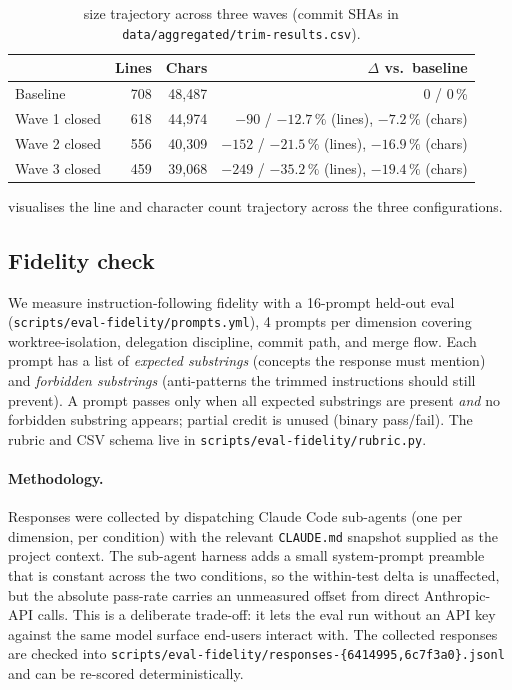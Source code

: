 \begin{table}[h]
\centering
\caption{\claudemd size trajectory across three waves (commit SHAs in
\texttt{data/aggregated/trim-results.csv}).}
\label{tab:size}
\begin{tabular}{lrrr}
\toprule
                  & Lines & Chars  & $\Delta$ vs.\ baseline \\
\midrule
Baseline          & 708   & 48{,}487 & 0 / 0\,\%             \\
Wave 1 closed     & 618   & 44{,}974 & $-90$ / $-12.7\,\%$ (lines), $-7.2\,\%$ (chars) \\
Wave 2 closed     & 556   & 40{,}309 & $-152$ / $-21.5\,\%$ (lines), $-16.9\,\%$ (chars) \\
Wave 3 closed     & 459   & 39{,}068 & $-249$ / $-35.2\,\%$ (lines), $-19.4\,\%$ (chars) \\
\bottomrule
\end{tabular}
\end{table}

 visualises the line and character count
trajectory across the three configurations.


\subsection{Fidelity check}
\label{sec:eval:fidelity}

We measure instruction-following fidelity with a 16-prompt held-out
eval (\texttt{scripts/\allowbreak eval-fidelity/\allowbreak prompts.yml}), 4 prompts per
dimension covering worktree-isolation, delegation discipline, commit
path, and merge flow. Each prompt has a list of
\emph{expected substrings} (concepts the response must mention) and
\emph{forbidden substrings} (anti-patterns the trimmed instructions
should still prevent). A prompt passes only when all expected
substrings are present \emph{and} no forbidden substring appears;
partial credit is unused (binary pass/fail). The rubric and CSV
schema live in \texttt{scripts/eval-fidelity/rubric.py}.

\paragraph{Methodology.}
Responses were collected by dispatching Claude Code sub-agents (one
per dimension, per condition) with the relevant \texttt{CLAUDE.md}
snapshot supplied as the project context. The sub-agent harness
adds a small system-prompt preamble that is constant across the two
conditions, so the within-test delta is unaffected, but the absolute
pass-rate carries an unmeasured offset from direct Anthropic-API
calls. This is a deliberate trade-off: it lets the eval run without
an API key against the same model surface end-users interact with.
The collected responses are checked into
\texttt{scripts/eval-fidelity/responses-\{6414995,6c7f3a0\}.jsonl}
and can be re-scored deterministically.

